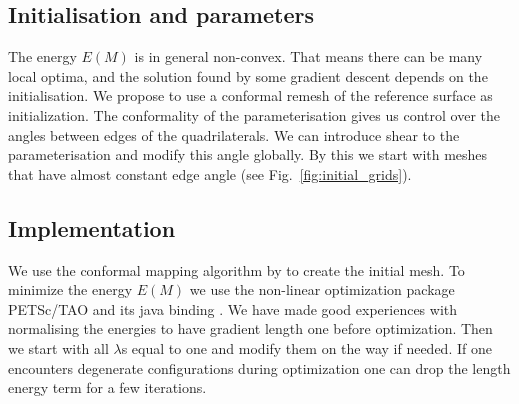 \subsection{Initialisation and parameters}
The energy $E(M)$ is in general non-convex. That means there can be many local optima, and the solution found by some gradient descent depends on the initialisation. We propose to use a conformal remesh of the reference surface as initialization. The conformality of the parameterisation gives us control over the angles between edges of the quadrilaterals. We can introduce shear to the parameterisation and modify this angle globally. By this we start with meshes that have almost constant edge angle (see Fig.~\ref{fig:initial_grids}).

\subsection{Implementation}
We use the conformal mapping algorithm by \cite{springbornetal:2008} to create the
initial mesh. To minimize the energy $E(M)$ we use the non-linear optimization package
PETSc/TAO \cite{petsc-web-page,tao-user-ref} and its java binding 
\cite{jpetsctao-web-page}. We have made good experiences with normalising the
 energies to have gradient length one before optimization. Then we start with all
$\lambda$s equal to one and modify them on the way if needed. If one encounters
degenerate configurations during optimization one can drop the length energy term for 
a few iterations.

